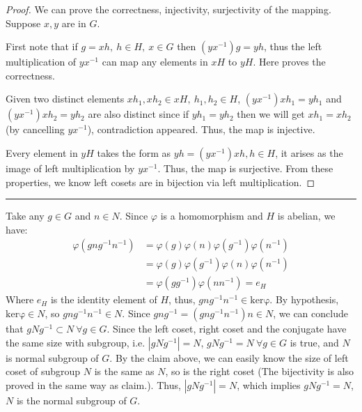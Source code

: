 \documentclass[12pt]{article}
\begin{document}
\begin{proof}
We can prove the correctness, injectivity, surjectivity of the mapping. Suppose $x,y$ are in $G$.

First note that if $g=xh,\ h\in H,\ x\in G$ then $(yx^{-1})g=yh$, thus the left multiplication of $yx^{-1}$ can map any elements in $xH$ to $yH$. Here proves the correctness.

Given two distinct elements $xh_1, xh_2\in xH,\ h_1,h_2\in H$, $(yx^{-1})xh_1=yh_1$ and $(yx^{-1})xh_2=yh_2$ are also distinct since if $yh_1=yh_2$ then we will get $xh_1=xh_2$ (by cancelling $yx^{-1}$), contradiction appeared. Thus, the map is injective.

Every element in $yH$ takes the form as $yh=(yx^{-1})xh,h\in H$, it arises as the image of left multiplication by $yx^{-1}$. Thus, the map is surjective. From these properties, we know left cosets are in bijection via left multiplication.
\end{proof}

\noindent\rule{\textwidth}{1pt}

Take any $g\in G$ and $n\in N$. Since $\varphi$ is a homomorphism and $H$ is abelian, we have:
\begin{align*}
    \varphi(gng^{-1}n^{-1}) &=\varphi(g)\varphi(n)\varphi(g^{-1})\varphi(n^{-1}) \\
    &= \varphi(g)\varphi(g^{-1})\varphi(n)\varphi(n^{-1}) \\
    &= \varphi(gg^{-1})\varphi(nn^{-1})=e_{H}
\end{align*}
Where $e_{H}$ is the identity element of $H$, thus, $gng^{-1}n^{-1}\in\mathrm{ker\varphi}$. By hypothesis, $\mathrm{ker\varphi}\in N$, so $gng^{-1}n^{-1}\in N$. Since $gng^{-1}=(gng^{-1}n^{-1})n\in N$, we can conclude that $gNg^{-1}\subset N\ \forall g\in G$. Since the left coset, right coset and the conjugate have the same size with subgroup, i.e. $|gNg^{-1}|=N$, $gNg^{-1}=N\ \forall g\in G$ is true, and $N$ is normal subgroup of $G$. By the claim above, we can easily know the size of left coset of subgroup $N$ is the same as $N$, so is the right coset (The bijectivity is also proved in the same way as claim.). Thus, $|gNg^{-1}|=N$, which implies $gNg^{-1}=N$, $N$ is the normal subgroup of $G$.
\end{document}
